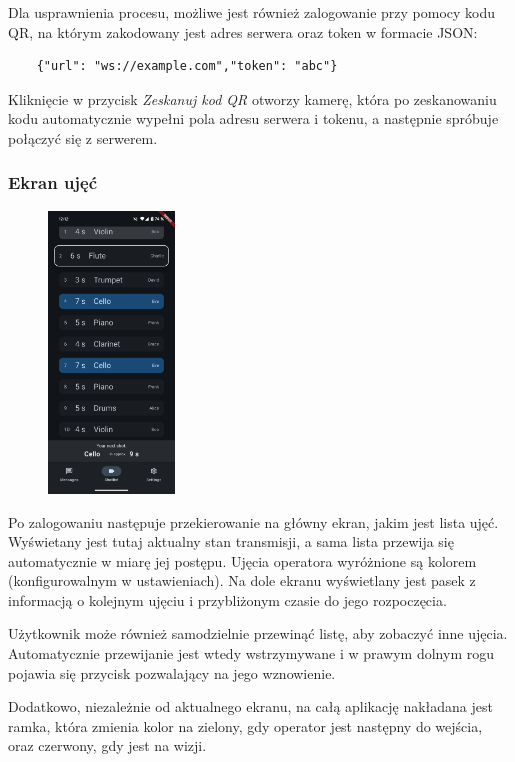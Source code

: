 \documentclass[11pt, letterpaper]{article}
\begin{document}
Dla usprawnienia procesu, możliwe jest również zalogowanie przy pomocy kodu QR, na którym zakodowany jest adres serwera oraz token w formacie JSON:
\begin{verbatim}
    {"url": "ws://example.com","token": "abc"}
\end{verbatim}
Kliknięcie w przycisk \textit{Zeskanuj kod QR} otworzy kamerę, która po zeskanowaniu kodu automatycznie wypełni pola adresu serwera i tokenu, a następnie spróbuje połączyć się z serwerem.

\subsubsection{Ekran ujęć}
\begin{figure}[H]
    \centering
    \includegraphics[width=0.3\textwidth]{shotlist.png}
\end{figure}
Po zalogowaniu następuje przekierowanie na główny ekran, jakim jest lista ujęć. Wyświetany jest tutaj aktualny stan transmisji, a sama lista przewija się automatycznie w miarę jej postępu. Ujęcia operatora wyróżnione są kolorem (konfigurowalnym w ustawieniach). Na dole ekranu wyświetlany jest pasek z informacją o kolejnym ujęciu i przybliżonym czasie do jego rozpoczęcia.

Użytkownik może również samodzielnie przewinąć listę, aby zobaczyć inne ujęcia. Automatycznie przewijanie jest wtedy wstrzymywane i w prawym dolnym rogu pojawia się przycisk pozwalający na jego wznowienie.

Dodatkowo, niezależnie od aktualnego ekranu, na całą aplikację nakładana jest ramka, która zmienia kolor na zielony, gdy operator jest następny do wejścia, oraz czerwony, gdy jest na wizji.
\end{document}
